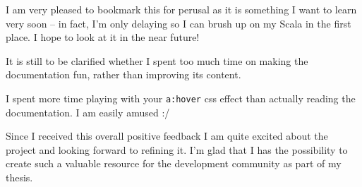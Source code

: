 \hrulefill

\begin{displayquote}

	I am very pleased to bookmark this for perusal as it is something I want to learn very soon -- in fact, I'm only delaying so I can brush up on my Scala in the first place. I hope to look at it in the near future!

\end{displayquote}

It is still to be clarified whether I spent too much time on making the documentation fun, rather than improving its content.

\begin{displayquote}

	I spent more time playing with your \texttt{a:hover} css effect than actually reading the documentation. I am easily amused :/

\end{displayquote}

Since I received this overall positive feedback I am quite excited about the project and looking forward to refining it. I'm glad that I has the possibility to create such a valuable resource for the development community as part of my thesis.